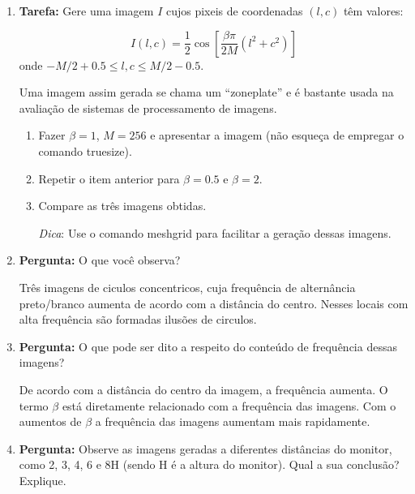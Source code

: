 \documentclass[11pt]{article}
\begin{document}
\begin{enumerate}

\item \textbf{Tarefa:} Gere uma imagem $I$ cujos pixeis de coordenadas $(l,c)$ têm valores:

\begin{equation}
I(l, c) = \frac{1}{2} \cos{\left [  \frac{\beta \pi}{2M}\left (l^2 + c^2 \right ) \right ]} \label{eq:zoneplate}
\end{equation}
onde $-M/2 + 0.5 \leq l, c \leq M/2 - 0.5$.

\noindent Uma imagem assim gerada se chama um ``zoneplate'' e é bastante usada na avaliação de sistemas de processamento de imagens.

\begin{enumerate}

\item Fazer $\beta = 1$, $M = 256$ e apresentar a imagem (não esqueça de empregar o comando \textsf{truesize}).

\item Repetir o item anterior para $\beta = 0.5$ e $\beta = 2$. 

\item Compare as três imagens obtidas.

\end{enumerate}

\begin{itemize}
\item[\textit{Dica}:] Use o comando \textsf{meshgrid} para facilitar a geração dessas imagens.
\end{itemize}

\item \textbf{Pergunta:} O que você observa? 

Três imagens de ciculos concentricos, cuja frequência de alternância preto/branco aumenta de acordo com a distância do centro. Nesses locais com alta frequência são formadas ilusões de circulos.

\item \textbf{Pergunta:} O que pode ser dito a respeito do conteúdo de frequência dessas imagens?

De acordo com a distância do centro da imagem, a frequência aumenta. O termo $\beta$ está diretamente relacionado com a frequência das imagens. Com o aumentos de $\beta$ a frequência das imagens aumentam mais rapidamente.

\item \textbf{Pergunta:} Observe as imagens geradas a diferentes distâncias do monitor, como 2, 3, 4, 6 e 8H (sendo H é a altura do monitor). Qual a sua conclusão? Explique.


\end{enumerate}
\end{document}
